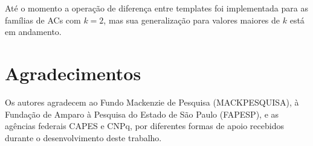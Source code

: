 \documentclass[12pt, a4paper]{article}
\begin{document}
Até o momento a operação de diferença entre templates foi implementada para as famílias de ACs com $k=2$, mas sua generalização para valores maiores de $k$ está em andamento.

\section*{Agradecimentos}
\label{sec:agrdecimentos}
Os autores agradecem ao Fundo Mackenzie de Pesquisa (MACKPESQUISA), à Fundação de Amparo à Pesquisa do Estado de São Paulo (FAPESP), e as agências federais CAPES e CNPq, por diferentes formas de apoio recebidos durante o desenvolvimento deste trabalho.

\def\refname{REFERÊNCIAS BIBLIOGRÁFICAS}


\end{document}
